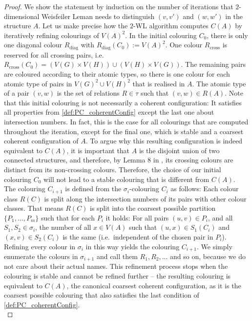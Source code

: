 \documentclass[a4paper,UKenglish,cleveref, autoref, thm-restate]{lipics-v2021}
\newcommand{\diag}{{\operatorname{diag}}}
\begin{document}
		\begin{proof}
			We show the statement by induction on the number of iterations that $2$-dimensional Weisfeiler Leman needs to distinguish $(v,v')$ and $(w,w')$ in the structure $A$. Let us make precise how the $2$-WL algorithm computes $C(A)$ by iteratively refining colourings of $V(A)^2$. In the initial colouring $C_0$, there is only one diagonal colour $R_{\diag}$ with $R_{\diag}(C_0) := V(A)^2$. One colour $R_{\text{cross}}$ is reserved for all crossing pairs, i.e.\ $R_{\text{cross}}(C_0) = (V(G) \times V(H)) \cup (V(H) \times V(G)) $. The remaining pairs are coloured according to their atomic types, so there is one colour for each atomic type of pairs in $V(G)^2 \cup V(H)^2$ that is realised in $A$. The atomic type of a pair $(v,w)$ is the set of relations $R \in \tau$ such that $(v,w) \in R(A)$.
			Note that this initial colouring is not necessarily a coherent configuration: It satisfies all properties from \autoref{def:PC_coherentConfig} except the last one about intersection numbers. In fact, this is the case for all colourings that are computed throughout the iteration, except for the final one, which is stable and a coarsest coherent configuration of $A$. To argue why this resulting configuration is indeed equivalent to $C(A)$, it is important that $A$ is the disjoint union of two connected structures, and therefore, by Lemma 8 in \cite{dwl}, its crossing colours are distinct from its non-crossing colours. Therefore, the choice of our initial colouring $C_0$ will not lead to a stable colouring that is different from $C(A)$.\\
			
			The colouring $C_{i+1}$ is defined from the $\sigma_i$-colouring $C_i$ as follows: Each colour class $R(C)$ is split along the intersection numbers of its pairs with other colour classes. That means $R(C)$ is split into the coarsest possible partition $\{ P_1,...,P_m \}$ such that for each $P_i$ it holds: For all pairs $(u,v) \in P_i$, and all $S_1, S_2 \in \sigma_i$, the number of all $x \in V(A)$ such that $(u,x) \in S_1(C_i)$ and $(x,v) \in S_2(C_i)$ is the same (i.e.\ independent of the chosen pair in $P_i$).\\
			Refining every colour in $\sigma_i$ in this way yields the colouring $C_{i+1}$. We simply enumerate the colours in $\sigma_{i+1}$ and call them $R_1,R_2,...$ and so on, because we do not care about their actual names. This refinement process stops when the colouring is stable and cannot be refined further -- the resulting colouring is equivalent to $C(A)$, the canonical coarsest coherent configuration, as it is the coarsest possible colouring that also satisfies the last condition of \autoref{def:PC_coherentConfig}.\\
			

\end{proof}
\end{document}
